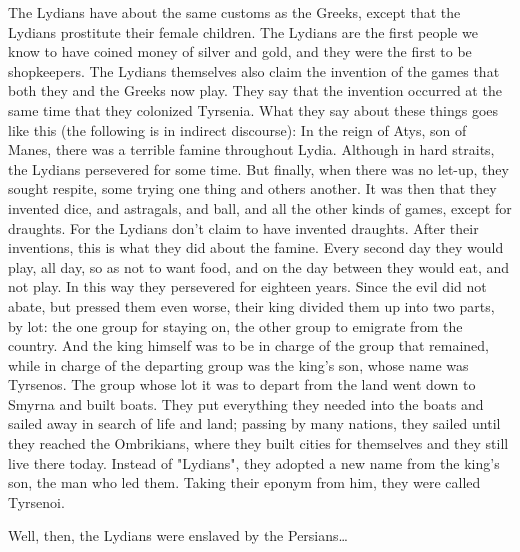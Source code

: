 \begin{latexquotation}
The Lydians have about the same customs as the Greeks, except that the
Lydians prostitute their female children. The Lydians are the first people
we know to have coined money of silver and gold, and they were the first to
be shopkeepers. The Lydians themselves also claim the invention of the
games that both they and the Greeks now play. They say that the invention
occurred at the same time that they colonized Tyrsenia. What they say
about these things goes like this (the following is in indirect discourse):
In the reign of Atys, son of Manes, there was a terrible famine
throughout Lydia. Although in hard straits, the Lydians persevered for
some time. But finally, when there was no let-up, they sought respite,
some trying one thing and others another. It was then that they invented
dice, and astragals, and ball, and all the other kinds of games, except for
draughts. For the Lydians don't claim to have invented draughts. After
their inventions, this is what they did about the famine. Every second
day they would play, all day, so as not to want food, and on the day
between they would eat, and not play. In this way they persevered for
eighteen years. Since the evil did not abate, but pressed them even
worse, their king divided them up into two parts, by lot: the one group
for staying on, the other group to emigrate from the country. And the
king himself was to be in charge of the group that remained, while in
charge of the departing group was the king's son, whose name was
Tyrsenos. The group whose lot it was to depart from the land went down
to Smyrna and built boats. They put everything they needed into the
boats and sailed away in search of life and land; passing by many
nations, they sailed until they reached the Ombrikians, where they built
cities for themselves and they still live there today. Instead of "Lydians",
they adopted a new name from the king's son, the man who led them.
Taking their eponym from him, they were called Tyrsenoi.

Well, then, the Lydians were enslaved by the Persians\ldots
\end{latexquotation}



